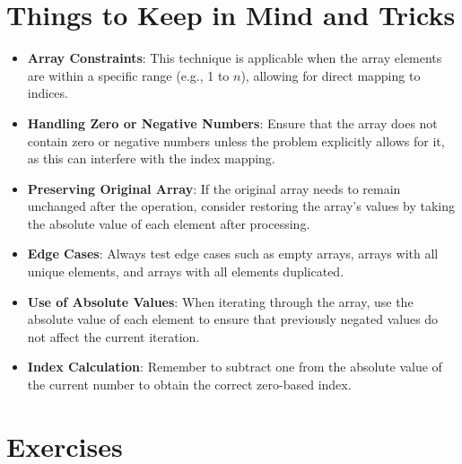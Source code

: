 \section*{Things to Keep in Mind and Tricks}

\begin{itemize}
    \item \textbf{Array Constraints}: This technique is applicable when the array elements are within a specific range (e.g., 1 to \(n\)), allowing for direct mapping to indices.
    
    \item \textbf{Handling Zero or Negative Numbers}: Ensure that the array does not contain zero or negative numbers unless the problem explicitly allows for it, as this can interfere with the index mapping.
    
    \item \textbf{Preserving Original Array}: If the original array needs to remain unchanged after the operation, consider restoring the array's values by taking the absolute value of each element after processing.
    
    \item \textbf{Edge Cases}: Always test edge cases such as empty arrays, arrays with all unique elements, and arrays with all elements duplicated.
    
    \item \textbf{Use of Absolute Values}: When iterating through the array, use the absolute value of each element to ensure that previously negated values do not affect the current iteration.
    
    \item \textbf{Index Calculation}: Remember to subtract one from the absolute value of the current number to obtain the correct zero-based index.
\end{itemize}

\section*{Exercises}

